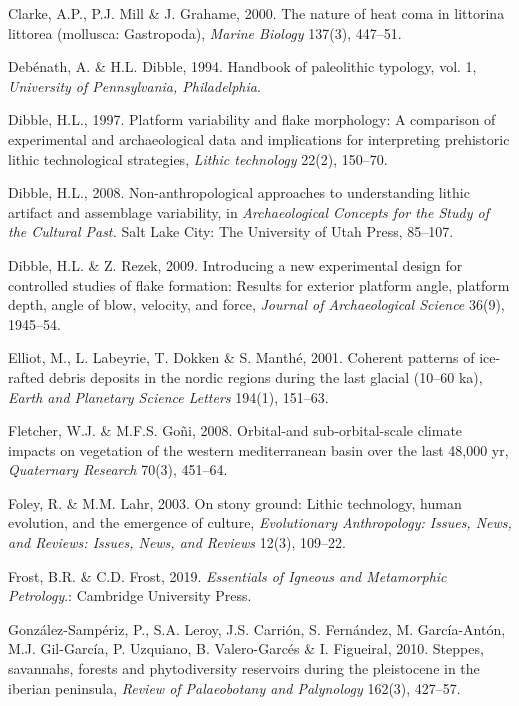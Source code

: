 \documentclass[12pt,twoside]{reedthesis}
\begin{document}
\leavevmode\hypertarget{ref-clarke2000}{}%
Clarke, A.P., P.J. Mill \& J. Grahame, 2000. The nature of heat coma in littorina littorea (mollusca: Gastropoda), \emph{Marine Biology} 137(3), 447--51.

\leavevmode\hypertarget{ref-debenath1994}{}%
Debénath, A. \& H.L. Dibble, 1994. Handbook of paleolithic typology, vol. 1, \emph{University of Pennsylvania, Philadelphia}.

\leavevmode\hypertarget{ref-dibble1997}{}%
Dibble, H.L., 1997. Platform variability and flake morphology: A comparison of experimental and archaeological data and implications for interpreting prehistoric lithic technological strategies, \emph{Lithic technology} 22(2), 150--70.

\leavevmode\hypertarget{ref-dibble2008}{}%
Dibble, H.L., 2008. Non-anthropological approaches to understanding lithic artifact and assemblage variability, in \emph{Archaeological Concepts for the Study of the Cultural Past.} Salt Lake City: The University of Utah Press, 85--107.

\leavevmode\hypertarget{ref-dibble2009}{}%
Dibble, H.L. \& Z. Rezek, 2009. Introducing a new experimental design for controlled studies of flake formation: Results for exterior platform angle, platform depth, angle of blow, velocity, and force, \emph{Journal of Archaeological Science} 36(9), 1945--54.

\leavevmode\hypertarget{ref-elliot2001}{}%
Elliot, M., L. Labeyrie, T. Dokken \& S. Manthé, 2001. Coherent patterns of ice-rafted debris deposits in the nordic regions during the last glacial (10--60 ka), \emph{Earth and Planetary Science Letters} 194(1), 151--63.

\leavevmode\hypertarget{ref-fletcher2008}{}%
Fletcher, W.J. \& M.F.S. Goñi, 2008. Orbital-and sub-orbital-scale climate impacts on vegetation of the western mediterranean basin over the last 48,000 yr, \emph{Quaternary Research} 70(3), 451--64.

\leavevmode\hypertarget{ref-foley2003}{}%
Foley, R. \& M.M. Lahr, 2003. On stony ground: Lithic technology, human evolution, and the emergence of culture, \emph{Evolutionary Anthropology: Issues, News, and Reviews: Issues, News, and Reviews} 12(3), 109--22.

\leavevmode\hypertarget{ref-frost2019}{}%
Frost, B.R. \& C.D. Frost, 2019. \emph{Essentials of Igneous and Metamorphic Petrology}.: Cambridge University Press.

\leavevmode\hypertarget{ref-gonzalez-samperiz2010}{}%
González-Sampériz, P., S.A. Leroy, J.S. Carrión, S. Fernández, M. García-Antón, M.J. Gil-García, P. Uzquiano, B. Valero-Garcés \& I. Figueiral, 2010. Steppes, savannahs, forests and phytodiversity reservoirs during the pleistocene in the iberian peninsula, \emph{Review of Palaeobotany and Palynology} 162(3), 427--57.
\end{document}
